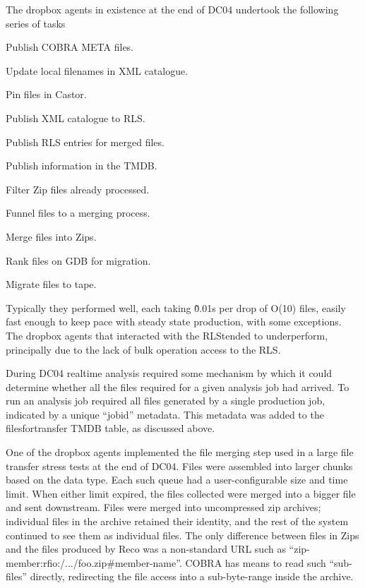 \documentclass{cmspaper}
\begin{document}
The dropbox agents in existence at the end of DC04 undertook the
following series of tasks
\begin{list}{}{}
\item Publish COBRA META files.
\item Update local filenames in XML catalogue.
\item Pin files in Castor.
\item Publish XML catalogue to RLS.
\item Publish RLS entries for merged files.
\item Publish information in the TMDB.
\item Filter Zip files already processed.
\item Funnel files to a merging process.
\item Merge files into Zips.
\item Rank files on GDB for migration.
\item Migrate files to tape.
\end{list}
Typically they performed well, each taking \~0.01s per drop of O(10)
files, easily fast enough to keep pace with steady state production,
with some exceptions. The dropbox agents that interacted with the
RLStended to underperform, principally due to the lack of bulk
operation access to the RLS.

During DC04 realtime analysis required some mechanism by which it
could determine whether all the files required for a given analysis
job had arrived. To run an analysis job required all files generated
by a single production job, indicated by a unique ``jobid'' metadata.
This metadata was added to the filesfortransfer TMDB table, as
discussed above.

One of the dropbox agents implemented the file merging step used in a
large file transfer stress tests at the end of DC04. Files were
assembled into larger chunks based on the data type.  Each such queue
had a user-configurable size and time limit.  When either limit
expired, the files collected were merged into a bigger file and sent
downstream.  Files were merged into uncompressed zip archives;
individual files in the archive retained their identity, and the rest
of the system continued to see them as individual files.  The only
difference between files in Zips and the files produced by Reco was a
non-standard URL such as ``zip-member:rfio:/.../foo.zip\#member-name''.
COBRA has means to read such ``sub-files'' directly, redirecting the
file access into a sub-byte-range inside the archive.
\end{document}
